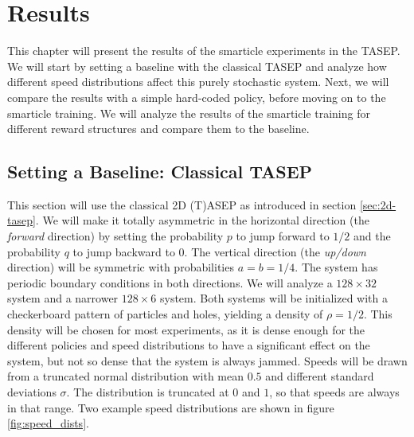 \graphicspath{{img/results}{img/results/out}}

\chapter{Results}
\label{ch:results}
This chapter will present the results of the smarticle experiments in the TASEP. We will start by setting a baseline with the classical TASEP and analyze how different speed distributions affect this purely stochastic system. Next, we will compare the results with a simple hard-coded policy, before moving on to the smarticle training. We will analyze the results of the smarticle training for different reward structures and compare them to the baseline. 

\section{Setting a Baseline: Classical TASEP}
\label{sec:baseline}
This section will use the classical 2D (T)ASEP as introduced in section \ref{sec:2d-tasep}. We will make it totally asymmetric in the horizontal direction (the \textit{forward} direction) by setting the probability $p$ to jump forward to $1/2$ and the probability $q$ to jump backward to $0$. The vertical direction (the \textit{up/down} direction) will be symmetric with probabilities $a=b=1/4$. The system has periodic boundary conditions in both directions. We will analyze a $128 \times 32$ system and a narrower $128 \times 6$ system. Both systems will be initialized with a checkerboard pattern of particles and holes, yielding a density of $\rho = 1/2$. This density will be chosen for most experiments, as it is dense enough for the different policies and speed distributions to have a significant effect on the system, but not so dense that the system is always jammed. Speeds will be drawn from a truncated normal distribution with mean $0.5$ and different standard deviations $\sigma$. The distribution is truncated at $0$ and $1$, so that speeds are always in that range. Two example speed distributions are shown in figure \ref{fig:speed_dists}. 
